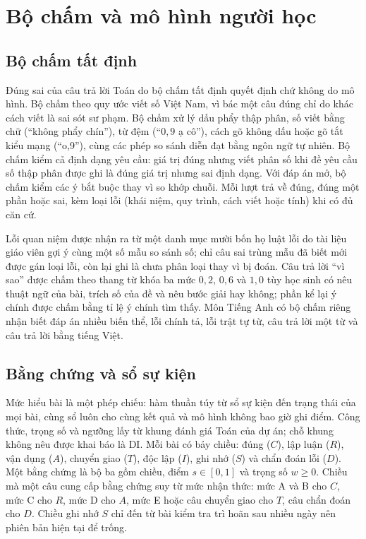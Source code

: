 \section{Bộ chấm và mô hình người học}\label{sec:learner-design}

\subsection{Bộ chấm tất định}
Đúng sai của câu trả lời Toán do bộ chấm tất định quyết định chứ không do mô hình. Bộ chấm theo quy ước viết số Việt Nam, vì bác một câu đúng chỉ do khác cách viết là sai sót sư phạm. Bộ chấm xử lý dấu phẩy thập phân, số viết bằng chữ (``không phẩy chín''), từ đệm (``$0{,}9$ ạ cô''), cách gõ không dấu hoặc gõ tắt kiểu mạng (``o,9''), cùng các phép so sánh diễn đạt bằng ngôn ngữ tự nhiên. Bộ chấm kiểm cả định dạng yêu cầu: giá trị đúng nhưng viết phân số khi đề yêu cầu số thập phân được ghi là đúng giá trị nhưng sai định dạng. Với đáp án mở, bộ chấm kiểm các ý bắt buộc thay vì so khớp chuỗi. Mỗi lượt trả về đúng, đúng một phần hoặc sai, kèm loại lỗi (khái niệm, quy trình, cách viết hoặc tính) khi có đủ căn cứ.

Lỗi quan niệm được nhận ra từ một danh mục mười bốn họ luật lỗi do tài liệu giáo viên gợi ý cùng một số mẫu so sánh số; chỉ câu sai trùng mẫu đã biết mới được gán loại lỗi, còn lại ghi là chưa phân loại thay vì bị đoán. Câu trả lời ``vì sao'' được chấm theo thang từ khóa ba mức $0{,}2$, $0{,}6$ và $1{,}0$ tùy học sinh có nêu thuật ngữ của bài, trích số của đề và nêu bước giải hay không; phần kể lại ý chính được chấm bằng tỉ lệ ý chính tìm thấy. Môn Tiếng Anh có bộ chấm riêng nhận biết đáp án nhiều biến thể, lỗi chính tả, lỗi trật tự từ, câu trả lời một từ và câu trả lời bằng tiếng Việt.

\subsection{Bằng chứng và sổ sự kiện}
Mức hiểu bài là một phép chiếu: hàm thuần túy từ sổ sự kiện đến trạng thái của mọi bài, cùng sổ luôn cho cùng kết quả và mô hình không bao giờ ghi điểm. Công thức, trọng số và ngưỡng lấy từ khung đánh giá Toán của dự án; chỗ khung không nêu được khai báo là DI. Mỗi bài có bảy chiều: đúng ($C$), lập luận ($R$), vận dụng ($A$), chuyển giao ($T$), độc lập ($I$), ghi nhớ ($S$) và chẩn đoán lỗi ($D$). Một bằng chứng là bộ ba gồm chiều, điểm $s\in[0,1]$ và trọng số $w\ge0$. Chiều mà một câu cung cấp bằng chứng suy từ mức nhận thức: mức A và B cho $C$, mức C cho $R$, mức D cho $A$, mức E hoặc câu chuyển giao cho $T$, câu chẩn đoán cho $D$. Chiều ghi nhớ $S$ chỉ đến từ bài kiểm tra trì hoãn sau nhiều ngày nên phiên bản hiện tại để trống.

